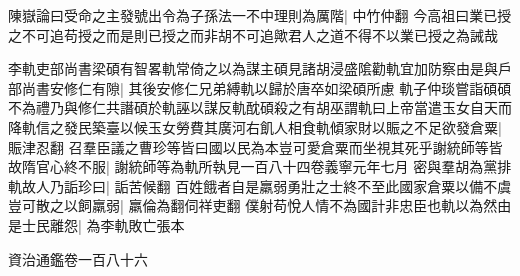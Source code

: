 陳嶽論曰受命之主發號出令為子孫法一不中理則為厲階|{
	中竹仲翻}
今高祖曰業已授之不可追苟授之而是則已授之而非胡不可追歟君人之道不得不以業已授之為誡哉

李軌吏部尚書梁碩有智畧軌常倚之以為謀主碩見諸胡浸盛隂勸軌宜加防察由是與戶部尚書安修仁有隙|{
	其後安修仁兄弟縛軌以歸於唐卒如梁碩所慮}
軌子仲琰嘗詣碩碩不為禮乃與修仁共譖碩於軌誣以謀反軌酖碩殺之有胡巫謂軌曰上帝當遣玉女自天而降軌信之發民築臺以候玉女勞費其廣河右飢人相食軌傾家財以賑之不足欲發倉粟|{
	賑津忍翻}
召羣臣議之曹珍等皆曰國以民為本豈可愛倉粟而坐視其死乎謝統師等皆故隋官心終不服|{
	謝統師等為軌所執見一百八十四卷義寧元年七月}
密與羣胡為黨排軌故人乃詬珍曰|{
	詬苦候翻}
百姓餓者自是羸弱勇壯之士終不至此國家倉粟以備不虞豈可散之以飼羸弱|{
	羸倫為翻伺祥吏翻}
僕射苟悅人情不為國計非忠臣也軌以為然由是士民離怨|{
	為李軌敗亡張本}


資治通鑑卷一百八十六
